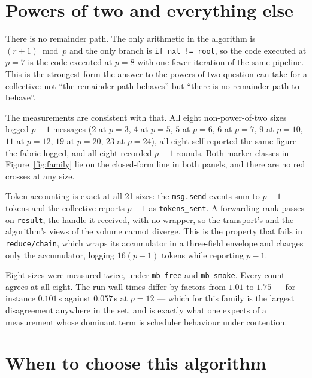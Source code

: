 \documentclass[11pt]{article}
\begin{document}
\section{Powers of two and everything else}

There is no remainder path. The only arithmetic in the algorithm is
$(r \pm 1) \bmod p$ and the only branch is \texttt{if nxt != root}, so the code executed at
$p=7$ is the code executed at $p=8$ with one fewer iteration of the same pipeline. This is the
strongest form the answer to the powers-of-two question can take for a collective: not ``the
remainder path behaves'' but ``there is no remainder path to behave''.

The measurements are consistent with that. All eight non-power-of-two sizes logged $p-1$
messages ($2$ at $p=3$, $4$ at $p=5$, $5$ at $p=6$, $6$ at $p=7$, $9$ at $p=10$, $11$ at
$p=12$, $19$ at $p=20$, $23$ at $p=24$), all eight self-reported the same figure the fabric
logged, and all eight recorded $p-1$ rounds. Both marker classes in Figure~\ref{fig:family}
lie on the closed-form line in both panels, and there are no red crosses at any size.

Token accounting is exact at all 21 sizes: the \texttt{msg.send} events sum to $p-1$ tokens and
the collective reports $p-1$ as \texttt{tokens\_sent}. A forwarding rank passes on
\texttt{result}, the handle it received, with no wrapper, so the transport's and the
algorithm's views of the volume cannot diverge. This is the property that fails in
\texttt{reduce/chain}, which wraps its accumulator in a three-field envelope and charges only
the accumulator, logging $16(p-1)$ tokens while reporting $p-1$.

Eight sizes were measured twice, under \texttt{mb-free} and \texttt{mb-smoke}. Every count
agrees at all eight. The run wall times differ by factors from $1.01$ to $1.75$ --- for
instance $0.101$\,s against $0.057$\,s at $p=12$ --- which for this family is the largest
disagreement anywhere in the set, and is exactly what one expects of a measurement whose
dominant term is scheduler behaviour under contention.

\section{When to choose this algorithm}
\end{document}
